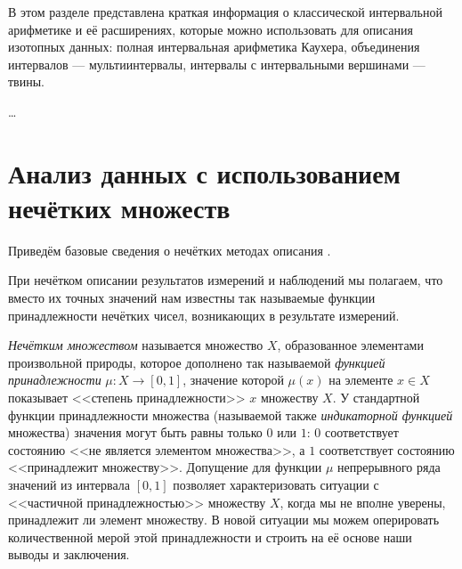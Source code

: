 \documentclass[a5paper,openany]{book}
\begin{document}
			В этом разделе представлена краткая информация о классической интервальной арифметике и её расширениях, которые можно использовать для  описания изотопных данных: полная интервальная арифметика Каухера, объединения интервалов --- мультиинтервалы, интервалы с интервальными вершинами --- твины.  
			
			\ldots
			
			
			\section{Анализ данных с использованием нечётких множеств}
			
			Приведём базовые сведения о нечётких методах описания \cite{BookInteStat}.
			
			При нечётком описании результатов измерений и наблюдений мы полагаем, что вместо их 
			точных значений нам известны так называемые функции принадлежности нечётких чисел, 
			возникающих в результате измерений. 
			
			\emph{Нечётким множеством} называется множество $X$, 
			образованное элементами произвольной природы, которое дополнено так называемой 
			\emph{функцией принадлежности} $\mu: X\to[0, 1]$, значение которой $\mu(x)$ на элементе 
			$x\in X$ показывает <<степень принадлежности>> $x$ множеству $X$. 
			У стандартной функции принадлежности множества (называемой также \emph{индикаторной 
				функцией} множества) значения могут быть равны только $0$ или $1$: $0$ соответствует 
			состоянию <<не является элементом множества>>, а $1$ соответствует состоянию <<принадлежит
			множеству>>. Допущение для функции $\mu$ непрерывного ряда значений из интервала $[0, 1]$ 
			позволяет характеризовать ситуации с <<частичной принадлежностью>> множеству $X$, когда 
			мы не вполне уверены, принадлежит ли элемент множеству. В новой ситуации мы можем 
			оперировать количественной мерой этой принадлежности и строить на её основе наши 
			выводы и заключения.  
			
\end{document}
